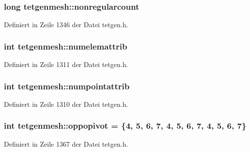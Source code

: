 \hypertarget{classtetgenmesh_a6619cdb6b99ed8546f2007c48b65ca3a}{
\subsubsection[{nonregularcount}]{\setlength{\rightskip}{0pt plus 5cm}long tetgenmesh\-::nonregularcount}}\label{classtetgenmesh_a6619cdb6b99ed8546f2007c48b65ca3a}


Definiert in Zeile 1346 der Datei tetgen.\-h.

\hypertarget{classtetgenmesh_afa4868ef4bde3366091028bcb3cf96c0}{
\subsubsection[{numelemattrib}]{\setlength{\rightskip}{0pt plus 5cm}int tetgenmesh\-::numelemattrib}}\label{classtetgenmesh_afa4868ef4bde3366091028bcb3cf96c0}


Definiert in Zeile 1311 der Datei tetgen.\-h.

\hypertarget{classtetgenmesh_a8d402a03733939c8d5e97438f39fe2d3}{
\subsubsection[{numpointattrib}]{\setlength{\rightskip}{0pt plus 5cm}int tetgenmesh\-::numpointattrib}}\label{classtetgenmesh_a8d402a03733939c8d5e97438f39fe2d3}


Definiert in Zeile 1310 der Datei tetgen.\-h.

\hypertarget{classtetgenmesh_a6ca1afb964b1b34272d978ddbc0686a9}{
\subsubsection[{oppopivot}]{\setlength{\rightskip}{0pt plus 5cm}int tetgenmesh\-::oppopivot = \{4, 5, 6, 7, 4, 5, 6, 7, 4, 5, 6, 7\}\hspace{0.3cm}{\ttfamily [static]}}}\label{classtetgenmesh_a6ca1afb964b1b34272d978ddbc0686a9}


Definiert in Zeile 1367 der Datei tetgen.\-h.

